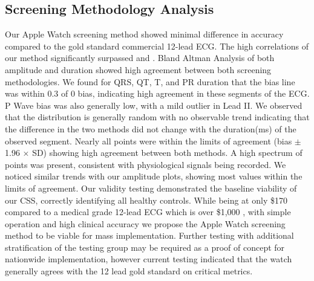 \documentclass[
	a4paper, 
	10pt, 
	twoside, 
]{LTJournalArticle}
\begin{document}
\subsection{Screening Methodology Analysis}

Our Apple Watch screening method showed minimal difference in accuracy compared to the gold standard commercial 12-lead ECG. The high correlations of our method significantly surpassed \textcite{Touiti2023} and \textcite{Behzadi2020}. Bland Altman Analysis of both amplitude and duration showed high agreement between both screening methodologies. We found for QRS, QT, T, and PR duration that the bias line was within 0.3 of 0 bias, indicating high agreement in these segments of the ECG. P Wave bias was also generally low, with a mild outlier in Lead II. We observed that the distribution is generally random with no observable trend indicating that the difference in the two methods did not change with the duration(ms) of the observed segment. Nearly all points were within the limits of agreement (bias $\pm$ 1.96 $\times$ SD) showing high agreement between both methods. A high spectrum of points was present, consistent with physiological signals being recorded. We noticed similar trends with our amplitude plots, showing most values within the limits of agreement. Our validity testing demonstrated the baseline viability of our CSS, correctly identifying all healthy controls. While being at only \$170 \cite{Turner_2024} compared to a medical grade 12-lead ECG which is over \$1,000 \cite{USA}, with simple operation and high clinical accuracy we propose the Apple Watch screening method to be viable for mass implementation. Further testing with additional stratification of the testing group may be required as a proof of concept for nationwide implementation, however current testing indicated that the watch generally agrees with the 12 lead gold standard on critical metrics. 
\end{document}
